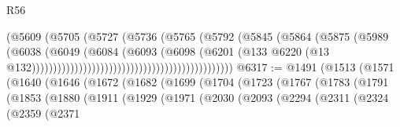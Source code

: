 \begin{lexlean}{R56}
\begin{coremodule}
                                                              (@5609
                                                                (@5705
                                                                  (@5727
                                                                    (@5736
                                                                      (@5765
                                                                        (@5792
                                                                          (@5845
                                                                            (@5864
                                                                              (@5875
                                                                                (@5989
                                                                                  (@6038
                                                                                    (@6049
                                                                                      (@6084
                                                                                        (@6093
                                                                                          (@6098
                                                                                            (@6201
                                                                                              (@133
                                                                                                @6220
                                                                                                (@13
                                                                                                  @132)))))))))))))))))))))))))))))))))))))))))))))))
@6317 := @1491
    (@1513
      (@1571
        (@1640
          (@1646
            (@1672
              (@1682
                (@1699
                  (@1704
                    (@1723
                      (@1767
                        (@1783
                          (@1791
                            (@1853
                              (@1880
                                (@1911
                                  (@1929
                                    (@1971
                                      (@2030
                                        (@2093
                                          (@2294
                                            (@2311
                                              (@2324
                                                (@2359
                                                  (@2371

\end{coremodule}
\end{lexlean}
